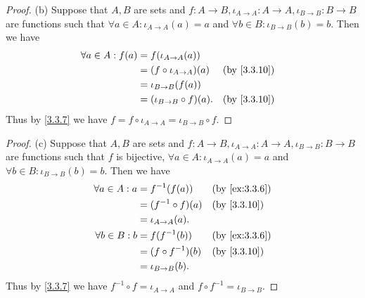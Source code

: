 \begin{proof}{(b)}
  Suppose that \(A, B\) are sets and \(f : A \to B, \iota_{A \to A} : A \to A, \iota_{B \to B} : B \to B\) are functions such that \(\forall a \in A : \iota_{A \to A}(a) = a\) and \(\forall b \in B : \iota_{B \to B}(b) = b\).
  Then we have
  \begin{align*}
    \forall a \in A : f(a) & = f(\iota_{A \to A}(a))                          \\
                           & = (f \circ \iota_{A \to A})(a)  &  & \by{3.3.10} \\
                           & = \iota_{B \to B}(f(a))                          \\
                           & = (\iota_{B \to B} \circ f)(a). &  & \by{3.3.10}
  \end{align*}
  Thus by \cref{3.3.7} we have \(f = f \circ \iota_{A \to A} = \iota_{B \to B} \circ f\).
\end{proof}

\begin{proof}{(c)}
  Suppose that \(A, B\) are sets and \(f : A \to B, \iota_{A \to A} : A \to A, \iota_{B \to B} : B \to B\) are functions such that \(f\) is bijective, \(\forall a \in A : \iota_{A \to A}(a) = a\) and \(\forall b \in B : \iota_{B \to B}(b) = b\).
  Then we have
  \begin{align*}
    \forall a \in A : a & = f^{-1}(f(a))        &  & \by{ex:3.3.6} \\
                        & = (f^{-1} \circ f)(a) &  & \by{3.3.10}   \\
                        & = \iota_{A \to A}(a).                    \\
    \forall b \in B : b & = f(f^{-1}(b))        &  & \by{ex:3.3.6} \\
                        & = (f \circ f^{-1})(b) &  & \by{3.3.10}   \\
                        & = \iota_{B \to B}(b).
  \end{align*}
  Thus by \cref{3.3.7} we have \(f^{-1} \circ f = \iota_{A \to A}\) and \(f \circ f^{-1} = \iota_{B \to B}\).
\end{proof}

